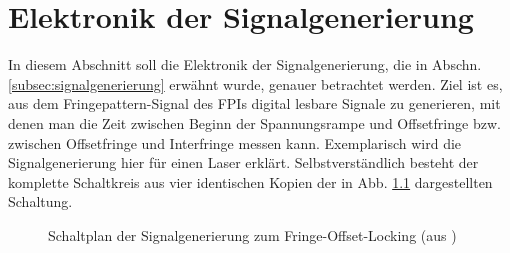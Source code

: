 \chapter{Elektronik der
Signalgenerierung}\label{anh:kap:signalgenerierung_elektronik} In diesem
Abschnitt soll die Elektronik der Signalgenerierung, die in Abschn. \ref{subsec:signalgenerierung} erwähnt wurde, genauer betrachtet werden.
Ziel ist es, aus dem Fringepattern-Signal des FPIs digital lesbare Signale zu
generieren, mit denen man die Zeit zwischen Beginn der
Spannungsrampe und Offsetfringe bzw. zwischen Offsetfringe
und Interfringe messen kann. Exemplarisch wird die Signalgenerierung hier
für einen Laser erklärt. Selbstverständlich besteht der komplette
Schaltkreis aus vier identischen Kopien der in Abb.
\ref{fig:signalgenerierung_schaltplan} dargestellten Schaltung.\par
\begin{figure}[h]
 	\centering
	\caption[Signalgenerierung - Schaltplan]{Schaltplan der
	Signalgenerierung zum
	Fringe-Offset-Locking (aus
	\cite{signalgenerierung})}\label{fig:signalgenerierung_schaltplan}
\end{figure}

